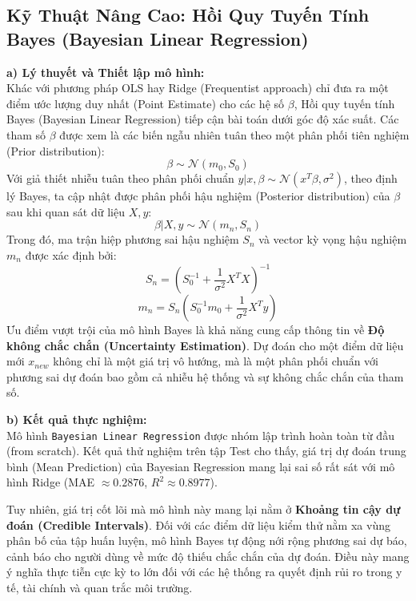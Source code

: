 \documentclass[12pt,a4paper]{article}
\begin{document}
\subsection{Kỹ Thuật Nâng Cao: Hồi Quy Tuyến Tính Bayes (Bayesian Linear Regression)}

\textbf{a) Lý thuyết và Thiết lập mô hình:} \\
Khác với phương pháp OLS hay Ridge (Frequentist approach) chỉ đưa ra một điểm ước lượng duy nhất (Point Estimate) cho các hệ số $\beta$, Hồi quy tuyến tính Bayes (Bayesian Linear Regression) tiếp cận bài toán dưới góc độ xác suất. Các tham số $\beta$ được xem là các biến ngẫu nhiên tuân theo một phân phối tiên nghiệm (Prior distribution):
\begin{equation}
    \beta \sim \mathcal{N}(m_0, S_0)
\end{equation}
Với giả thiết nhiễu tuân theo phân phối chuẩn $y|x,\beta \sim \mathcal{N}(x^T\beta, \sigma^2)$, theo định lý Bayes, ta cập nhật được phân phối hậu nghiệm (Posterior distribution) của $\beta$ sau khi quan sát dữ liệu $X, y$:
\begin{equation}
    \beta|X,y \sim \mathcal{N}(m_n, S_n)
\end{equation}
Trong đó, ma trận hiệp phương sai hậu nghiệm $S_n$ và vector kỳ vọng hậu nghiệm $m_n$ được xác định bởi:
\begin{equation}
    S_n = \left( S_0^{-1} + \frac{1}{\sigma^2}X^T X \right)^{-1}
\end{equation}
\begin{equation}
    m_n = S_n \left( S_0^{-1}m_0 + \frac{1}{\sigma^2}X^T y \right)
\end{equation}
Ưu điểm vượt trội của mô hình Bayes là khả năng cung cấp thông tin về \textbf{Độ không chắc chắn (Uncertainty Estimation)}. Dự đoán cho một điểm dữ liệu mới $x_{new}$ không chỉ là một giá trị vô hướng, mà là một phân phối chuẩn với phương sai dự đoán bao gồm cả nhiễu hệ thống và sự không chắc chắn của tham số.

\textbf{b) Kết quả thực nghiệm:} \\
Mô hình \texttt{Bayesian Linear Regression} được nhóm lập trình hoàn toàn từ đầu (from scratch). Kết quả thử nghiệm trên tập Test cho thấy, giá trị dự đoán trung bình (Mean Prediction) của Bayesian Regression mang lại sai số rất sát với mô hình Ridge (MAE $\approx 0.2876$, $R^2 \approx 0.8977$).

Tuy nhiên, giá trị cốt lõi mà mô hình này mang lại nằm ở \textbf{Khoảng tin cậy dự đoán (Credible Intervals)}. Đối với các điểm dữ liệu kiểm thử nằm xa vùng phân bố của tập huấn luyện, mô hình Bayes tự động nới rộng phương sai dự báo, cảnh báo cho người dùng về mức độ thiếu chắc chắn của dự đoán. Điều này mang ý nghĩa thực tiễn cực kỳ to lớn đối với các hệ thống ra quyết định rủi ro trong y tế, tài chính và quan trắc môi trường.
\end{document}
